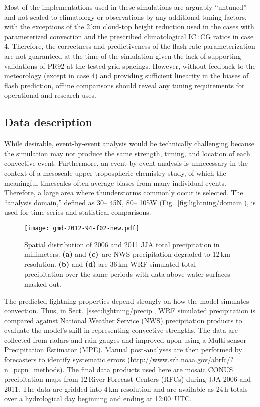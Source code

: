Most of the implementations used in these simulations are arguably
``untuned'' and not scaled to climatology or observations by any additional
tuning factors, with the exceptions of the 2\,\unit{km} cloud-top height
reduction used in the cases with parameterized convection and the prescribed
climatological IC\,:\,CG ratios in case 4. Therefore, the correctness and
predictiveness of the flash rate parameterization are not guaranteed at the
time of the simulation given the lack of supporting validations of PR92 at
the tested grid spacings. However, without feedback to the meteorology
(except in case 4) and providing sufficient linearity in the biases of flash
prediction, offline comparisons should reveal any tuning requirements for
operational and research uses.

\subsection{Data description}\label{ssec:lightning/data}

While desirable, event-by-event analysis would be technically challenging
because the simulation may not produce the same strength, timing, and
location of each convective event. Furthermore, an event-by-event analysis is
unnecessary in the context of a mesoscale upper tropospheric chemistry study,
of which the meaningful timescales often average biases from many individual
events. Therefore, a large area where thunderstorms commonly occur is
selected. The ``analysis domain,'' defined as 30\degr -- 45\degr N,
80\degr -- 105\degr W (Fig.~\ref{fig:lightning/domain}), is used for time series
and statistical comparisons.


\begin{figure*}[t]
\texttt{[image: gmd-2012-94-f02-new.pdf]}
\caption{Spatial distribution of 2006 and 2011 JJA total precipitation in
millimeters. \textbf{(a)} and \textbf{(c)}~are NWS precipitation degraded to
12\,\unit{km} resolution. \textbf{(b)} and \textbf{(d)} are 36\,\unit{km}
WRF-simulated total precipitation over the same periods with data above water
surfaces masked out.} \label{fig:lightning/precipmap}
\end{figure*}



The predicted lightning properties depend strongly on how the model simulates
convection. Thus, in Sect.~\ref{ssec:lightning/precip}, WRF simulated precipitation
is compared against National Weather Service (NWS) precipitation products to
evaluate the model's skill in representing convective strengths. The data are
collected from radars and rain gauges and \mbox{improved} upon using a Multi-sensor
Precipitation Estimator (MPE). Manual post-analyses are then performed by
forecasters to identify systematic errors
(\url{http://www.srh.noaa.gov/abrfc/?n=pcpn\_methods}). The final data products
used here are mosaic CONUS precipitation maps from 12\,River Forecast Centers
(RFCs) during JJA 2006 and 2011. The data are gridded into 4\,\unit{km}
resolution and are available as 24\,h totals over a hydrological day
beginning and ending at 12:00~UTC.

